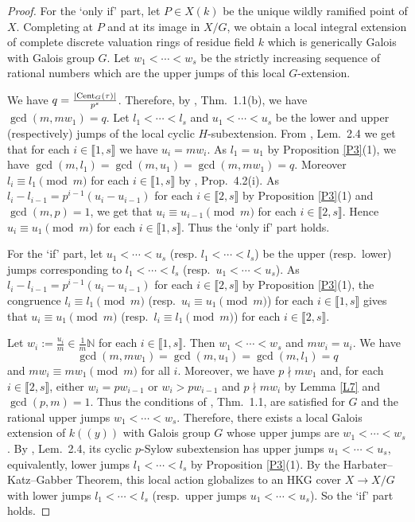 \documentclass[11pt]{amsart}
\begin{document}
\begin{proof}
For the `only if' part, let $P\in X(k)$ be the unique wildly ramified point of $X$. Completing at $P$ and at its image in $X/G$, we obtain a local
integral extension of complete discrete valuation rings of residue field $k$ which is generically Galois with Galois group $G$. Let $w_1<\cdots <w_s$ be the strictly increasing sequence of rational numbers which are the upper jumps of this local $G$-extension. 

We have $q=\frac{|{\rm Cent}_G(\tau)|}{p^s}$. Therefore, by \cite{OP}, Thm.\ 1.1(b), we have $\gcd(m,mw_1)=q$. 
Let $l_1< \cdots< l_s$ and $u_1< \cdots< u_s$ be the lower and upper (respectively) jumps of the local cyclic $H$-subextension. From \cite{OP}, Lem.\ 2.4 we get that for each $i\in\llbracket1,s\rrbracket$ we have $u_i=mw_i$.
As $l_1=u_1$ by Proposition \ref{P3}(1), we have $\gcd(m,l_1)=\gcd(m,u_1)=\gcd(m,mw_1)=q$.
Moreover $l_i\equiv l_1\pmod m$ for each $i\in\llbracket1,s\rrbracket$ by \cite{OP}, Prop.\ 4.2(i). As $l_i-l_{i-1}=p^{i-1}(u_i-u_{i-1})$ for each $i\in\llbracket2,s\rrbracket$ by Proposition \ref{P3}(1) and $\gcd(m,p)=1$, we get that $u_i\equiv u_{i-1}\pmod{m}$ for each $i\in\llbracket2,s\rrbracket$. Hence $u_i\equiv u_1\pmod{m}$ for each $i\in\llbracket1,s\rrbracket$. Thus the `only if' part holds.

For the `if' part, let $u_1<\cdots<u_s$ (resp. $l_1<\cdots<l_s$) be the upper (resp.\ lower) jumps corresponding to $l_1<\cdots<l_s$ (resp.\ $u_1<\cdots<u_s$). As $l_i-l_{i-1}=p^{i-1}(u_i-u_{i-1})$ for each $i\in\llbracket2,s\rrbracket$ by Proposition \ref{P3}(1), the congruence $l_i\equiv l_1\pmod m$ (resp.\ $u_i\equiv u_1\pmod m$) for each $i\in\llbracket1,s\rrbracket$ gives that $u_i\equiv u_1\pmod m$ (resp.\ $l_i\equiv l_1\pmod m$) for each $i\in\llbracket2,s\rrbracket$.

Let $w_i:=\frac{u_i}{m}\in \frac{1}{m}\mathbb N$ for each $i\in\llbracket1,s\rrbracket$. Then $w_1<\cdots<w_s$ and $mw_i=u_i$. We have
\[
\gcd(m,mw_1)=\gcd(m,u_1)=\gcd(m,l_1)=q
\]
and $mw_i\equiv mw_1\pmod m$ for all $i$. Moreover, we have $p\nmid mw_1$ and,  for each $i\in\llbracket2,s\rrbracket$, either $w_i=pw_{i-1}$ or $w_i>pw_{i-1}$ and $p\nmid mw_i$ by Lemma \ref{L7} and $\gcd(p,m)=1$. Thus the conditions of \cite{OP}, Thm.\ 1.1, are satisfied for $G$ and the rational upper jumps $w_1<\cdots<w_s$. Therefore, there exists a local Galois extension of $k((y))$ with Galois group $G$ whose upper jumps are $w_1<\cdots<w_s$. By \cite{OP}, Lem.\ 2.4, its cyclic $p$-Sylow subextension has upper jumps $u_1<\cdots<u_s$, equivalently, lower jumps $l_1<\cdots<l_s$ by Proposition \ref{P3}(1). By the Harbater--Katz--Gabber Theorem, this local action globalizes to an HKG cover $X\rightarrow X/G$ with lower jumps $l_1<\cdots<l_s$ (resp.\  upper jumps $u_1<\cdots<u_s$). So the `if' part holds.
\end{proof}
\end{document}
